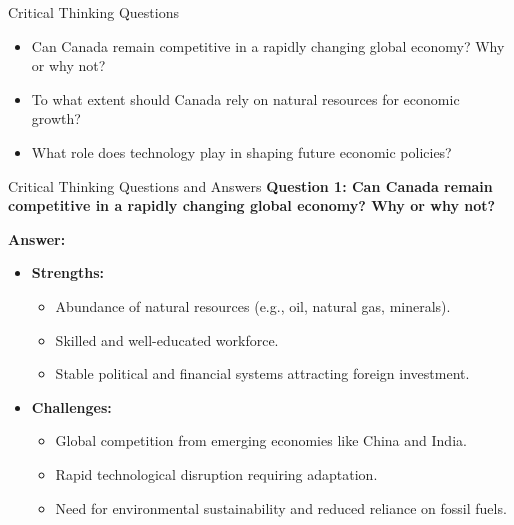 \documentclass{beamer}
\begin{document}

\begin{frame}{Critical Thinking Questions}
  \begin{itemize}
    \item Can Canada remain competitive in a rapidly changing global economy? Why or why not?
    \item To what extent should Canada rely on natural resources for economic growth?
    \item What role does technology play in shaping future economic policies?
  \end{itemize}
\end{frame}

\begin{frame}{Critical Thinking Questions and Answers}
  \textbf{Question 1: Can Canada remain competitive in a rapidly changing global economy? Why or why not?}

  \textbf{Answer:}
  \begin{itemize}
    \item \textbf{Strengths:}
      \begin{itemize}
        \item Abundance of natural resources (e.g., oil, natural gas, minerals).
        \item Skilled and well-educated workforce.
        \item Stable political and financial systems attracting foreign investment.
      \end{itemize}
    \item \textbf{Challenges:}
      \begin{itemize}
        \item Global competition from emerging economies like China and India.
        \item Rapid technological disruption requiring adaptation.
        \item Need for environmental sustainability and reduced reliance on fossil fuels.
      \end{itemize}
    
  \end{itemize}
\end{frame}
\end{document}
